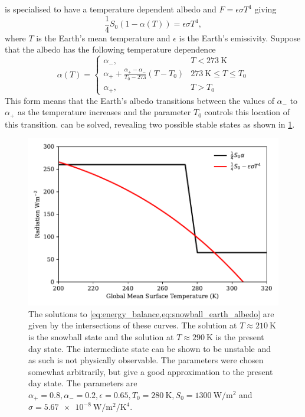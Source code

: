  is specialised to have a temperature dependent albedo and $F = \epsilon \sigma T^4$ giving
\begin{equation}
  \label{eq:energy_balance}
  \frac{1}{4}S_0 \left(1 - \alpha\left(T\right)\right) = \epsilon \sigma T^4,
\end{equation}
where $T$ is the Earth's mean temperature and $\epsilon$ is the Earth's emissivity. Suppose that the albedo has the following
temperature dependence
\begin{equation}
  \label{eq:snowball_earth_albedo}
  \alpha(T) =
  \begin{cases}
    \alpha_- ,                                                         & T < \SI{273}{\kelvin} \\
    \alpha_+ + \frac{\alpha_+ - \alpha_-}{T_0 - 273} \left(T-T_0\right) & \SI{273}{\kelvin} \leq T \leq T_0 \\
    \alpha_+ ,                                                         & T > T_0
  \end{cases}
\end{equation}
This form means that the Earth's albedo transitions between the values of $\alpha_-$ to $\alpha_+$ as the temperature increases and the parameter $T_0$ controls this location of this transition.
 can be solved, revealing two possible stable states as shown in \cref{fig:energy_balance_solution}.
\begin{figure}
  \centering
  \includegraphics[width=\textwidth,keepaspectratio]{snowball}
  \caption{The solutions to \cref{eq:energy_balance,eq:snowball_earth_albedo} are given by the intersections of these curves. The solution at $T\approx\SI{210}{\kelvin}$ is the snowball
    state and the solution at $T\approx \SI{290}{\kelvin}$ is the present day state. The intermediate state can be shown to be unstable and as such is not physically observable. The parameters were
    chosen somewhat arbitrarily,  but give a good approximation to the present day state. The parameters are $\alpha_+ = 0.8,\alpha_-=0.2,\epsilon=0.65,T_0 = \SI{280}{\kelvin},S_0 = \SI{1300}{\watt\per\meter\squared}$
    and $\sigma = \SI{5.67e-8}{\watt\per\meter\squared\per\kelvin\tothe{4}}$.}
  \label{fig:energy_balance_solution}
\end{figure}

